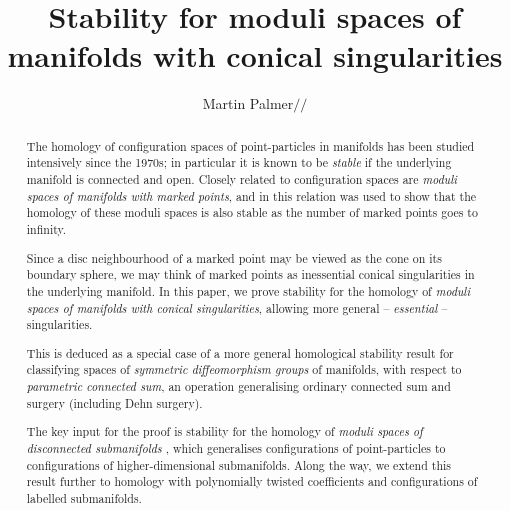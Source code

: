 \documentclass[reqno,a4paper]{article}
\numberwithin{equation}{section}
\theoremstyle{italicised}
\theoremstyle{upright}
\theoremstyle{italicised-restate}
\begin{document}
\title{\large\bfseries Stability for moduli spaces of manifolds with conical singularities \vspace{-1ex}}
\author{\small Martin Palmer\quad $/\!\!/$\quad \todaysdate\vspace{-1ex}}
\date{}
\maketitle
{
\makeatletter
\renewcommand*{\BHFN@OldMakefntext}{}
\makeatother
{}
}
\begin{abstract}
The homology of configuration spaces of point-particles in manifolds has been studied intensively since the 1970s; in particular it is known to be \emph{stable} if the underlying manifold is connected and open. Closely related to configuration spaces are \emph{moduli spaces of manifolds with marked points}, and in \cite{Tillmann2016Homologystabilitysymmetric} this relation was used to show that the homology of these moduli spaces is also stable as the number of marked points goes to infinity.

Since a disc neighbourhood of a marked point may be viewed as the cone on its boundary sphere, we may think of marked points as inessential conical singularities in the underlying manifold. In this paper, we prove stability for the homology of \emph{moduli spaces of manifolds with conical singularities}, allowing more general -- \emph{essential} -- singularities.

This is deduced as a special case of a more general homological stability result for classifying spaces of \emph{symmetric diffeomorphism groups} of manifolds, with respect to \emph{parametric connected sum}, an operation generalising ordinary connected sum and surgery (including Dehn surgery).

The key input for the proof is stability for the homology of \emph{moduli spaces of disconnected submanifolds} \cite{Palmer2018HomologicalstabilitymoduliI}, which generalises configurations of point-particles to configurations of higher-dimensional submanifolds. Along the way, we extend this result further to homology with polynomially twisted coefficients and configurations of labelled submanifolds.
\end{abstract}
\end{document}
